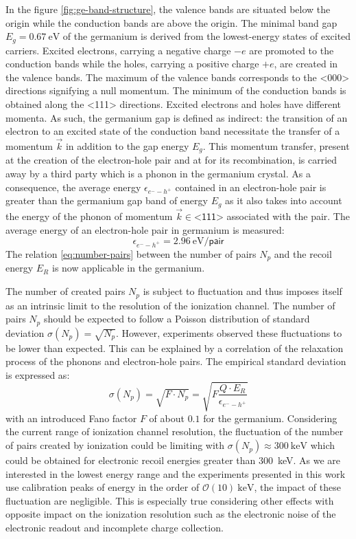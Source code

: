 In the figure \ref{fig:ge-band-structure}, the valence bands are situated below the origin while the conduction bands are above the origin. The minimal band gap $E_g = \SI{0.67}{\eV}$ of the germanium is derived from the lowest-energy states of excited carriers. Excited electrons, carrying a negative charge $-e$ are promoted to the conduction bands while the holes, carrying a positive charge $+e$, are created in the valence bands. The maximum of the valence bands corresponds to the <000> directions signifying a null momentum. The minimum of the conduction bands is obtained along the <111> directions. Excited electrons and holes have different momenta. As such, the germanium gap is defined as indirect: the transition of an electron to an excited state of the conduction band necessitate the transfer of a momentum $\vec{k}$ in addition to the gap energy $E_g$. This momentum transfer, present at the creation of the electron-hole pair and at for its recombination, is carried away by a third party which is a phonon in the germanium crystal. As a consequence, the average energy $\epsilon_{e^--h^+}$ contained in an electron-hole pair is greater than the germanium gap band of energy $E_g$ as it also takes into account the energy of the phonon of momentum $\vec{k} \in \textsf{<111>}$ associated with the pair. The average energy of an electron-hole pair in germanium is measured:
\begin{equation}
\label{eq:energy-pair}
\epsilon_{e^--h^+} = \SI{2.96}{\eV \per \textsf{pair}}
\end{equation} 
The relation \ref{eq:number-pairs} between the number of pairs $N_p$ and the recoil energy $E_R$ is now applicable in the germanium.

The number of created pairs $N_p$ is subject to fluctuation and thus imposes itself as an intrinsic limit to the resolution of the ionization channel. The number of pairs $N_p$ should be expected to follow a Poisson distribution of standard deviation $\sigma(N_p) = \sqrt{N_p}$. However, experiments observed these fluctuations to be lower than expected. This can be explained by a correlation of the relaxation process of the phonons and electron-hole pairs. The empirical standard deviation is expressed as:
\begin{equation}
\sigma(N_p)
=
\sqrt{F \cdot N_p}
=
\sqrt{F \frac{Q \cdot E_R}{\epsilon_{e^--h^+}}}
\end{equation}
with an introduced Fano factor $F$ of about $0.1$ for the germanium. Considering the current range of ionization channel resolution, the fluctuation of the number of pairs created by ionization could be limiting with $\sigma(N_p) \approx \SI{300}{\kilo\eV}$ which could be obtained for electronic recoil energies greater than \SI{300}{\kilo\eV}. As we are interested in the lowest energy range and the experiments presented in this work use calibration peaks of energy in the order of $\mathcal{O}(10)\ \si{\kilo\eV}$, the impact of these fluctuation are negligible. This is especially true considering other effects with opposite impact on the ionization resolution such as the electronic noise of the electronic readout and incomplete charge collection.

